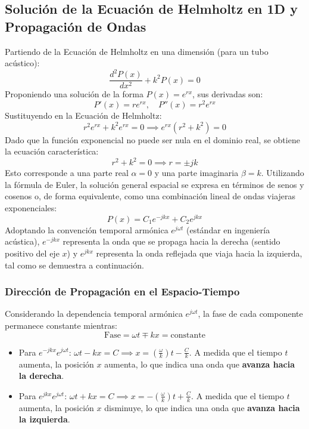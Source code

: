 \documentclass[11pt,letterpaper]{article}
\begin{document}
\subsection{Solución de la Ecuación de Helmholtz en 1D y Propagación de Ondas}

Partiendo de la Ecuación de Helmholtz en una dimensión (para un tubo acústico):
\begin{equation}
    \frac{d^2 P(x)}{dx^2} + k^2 P(x) = 0
\end{equation}
Proponiendo una solución de la forma $P(x) = e^{rx}$, sus derivadas son:
\begin{equation}
    P'(x) = r e^{rx}, \quad P''(x) = r^2 e^{rx}
\end{equation}
Sustituyendo en la Ecuación de Helmholtz:
\begin{equation}
    r^2 e^{rx} + k^2 e^{rx} = 0 \implies e^{rx}(r^2 + k^2) = 0
\end{equation}
Dado que la función exponencial no puede ser nula en el dominio real, se obtiene la ecuación característica:
\begin{equation}
    r^2 + k^2 = 0 \implies r = \pm jk
\end{equation}
Esto corresponde a una parte real $\alpha = 0$ y una parte imaginaria $\beta = k$. Utilizando la fórmula de Euler, la solución general espacial se expresa en términos de senos y cosenos o, de forma equivalente, como una combinación lineal de ondas viajeras exponenciales:
\begin{equation}
    P(x) = C_1 e^{-jkx} + C_2 e^{jkx}
\end{equation}
Adoptando la convención temporal armónica $e^{j\omega t}$ (estándar en ingeniería acústica), $e^{-jkx}$ representa la onda que se propaga hacia la derecha (sentido positivo del eje $x$) y $e^{jkx}$ representa la onda reflejada que viaja hacia la izquierda, tal como se demuestra a continuación.

\subsubsection{Dirección de Propagación en el Espacio-Tiempo}\label{sec:direccion-propagacion}
Considerando la dependencia temporal armónica $e^{j\omega t}$, la fase de cada componente permanece constante mientras:
\begin{equation}
    \text{Fase} = \omega t \mp kx = \text{constante}
\end{equation}
\begin{itemize}
    \item Para $e^{-jkx} e^{j\omega t}$: $\omega t - kx = C \implies x = \left(\frac{\omega}{k}\right)t - \frac{C}{k}$. A medida que el tiempo $t$ aumenta, la posición $x$ aumenta, lo que indica una onda que \textbf{avanza hacia la derecha}.
    \item Para $e^{jkx} e^{j\omega t}$: $\omega t + kx = C \implies x = -\left(\frac{\omega}{k}\right)t + \frac{C}{k}$. A medida que el tiempo $t$ aumenta, la posición $x$ disminuye, lo que indica una onda que \textbf{avanza hacia la izquierda}.
\end{itemize}
\end{document}
